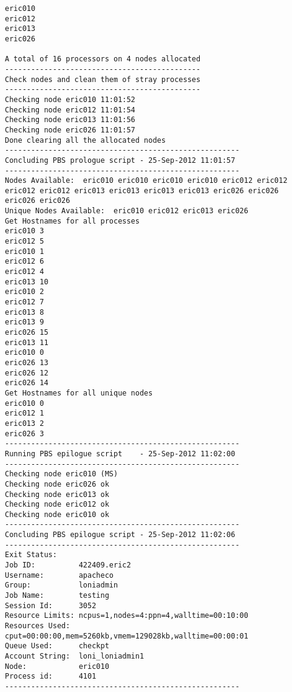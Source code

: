 \documentclass[slidestop,mathserif,compress,xcolor=svgnames]{beamer}
\begin{document}
\begin{frame}
{\begin{verbatim}
eric010
eric012
eric013
eric026

A total of 16 processors on 4 nodes allocated
---------------------------------------------
Check nodes and clean them of stray processes
---------------------------------------------
Checking node eric010 11:01:52 
Checking node eric012 11:01:54 
Checking node eric013 11:01:56 
Checking node eric026 11:01:57 
Done clearing all the allocated nodes
------------------------------------------------------
Concluding PBS prologue script - 25-Sep-2012 11:01:57
------------------------------------------------------
Nodes Available:  eric010 eric010 eric010 eric010 eric012 eric012 eric012 eric012 eric013 eric013 eric013 eric013 eric026 eric026 
eric026 eric026
Unique Nodes Available:  eric010 eric012 eric013 eric026
Get Hostnames for all processes
eric010 3
eric012 5
eric010 1
eric012 6
eric012 4
eric013 10
eric010 2
eric012 7
eric013 8
eric013 9
eric026 15
eric013 11
eric010 0
eric026 13
eric026 12
eric026 14
Get Hostnames for all unique nodes
eric010 0
eric012 1
eric013 2
eric026 3
------------------------------------------------------
Running PBS epilogue script    - 25-Sep-2012 11:02:00
------------------------------------------------------
Checking node eric010 (MS)
Checking node eric026 ok
Checking node eric013 ok
Checking node eric012 ok
Checking node eric010 ok
------------------------------------------------------
Concluding PBS epilogue script - 25-Sep-2012 11:02:06
------------------------------------------------------
Exit Status:    
Job ID:          422409.eric2
Username:        apacheco
Group:           loniadmin
Job Name:        testing
Session Id:      3052
Resource Limits: ncpus=1,nodes=4:ppn=4,walltime=00:10:00
Resources Used:  cput=00:00:00,mem=5260kb,vmem=129028kb,walltime=00:00:01
Queue Used:      checkpt
Account String:  loni_loniadmin1
Node:            eric010
Process id:      4101
------------------------------------------------------
    \end{verbatim}
  }
\end{frame}
\end{document}
